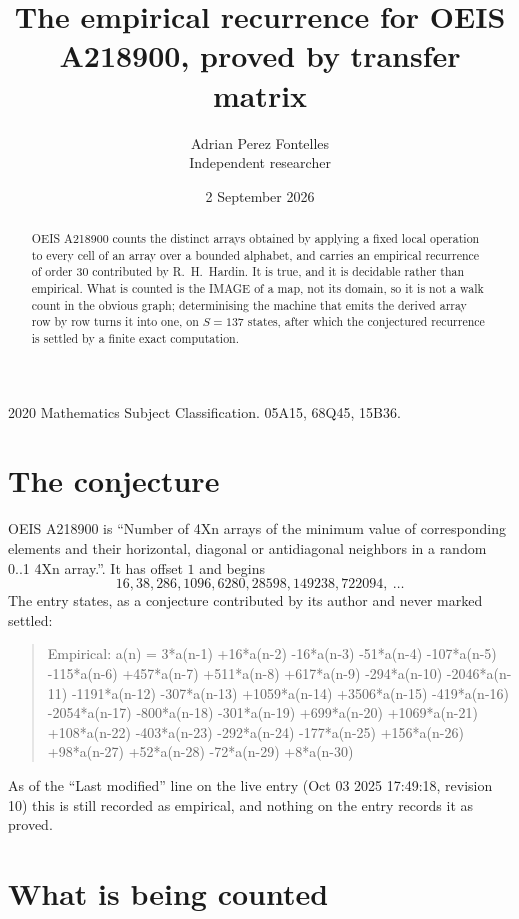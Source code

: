 \documentclass[11pt,a4paper]{article}
\title{The empirical recurrence for OEIS A218900, proved by transfer matrix}
\author{Adrian Perez Fontelles\\ \small Independent researcher}
\date{2 September 2026}
\theoremstyle{plain}
\theoremstyle{definition}
\begin{document}
\maketitle

\begin{abstract}
OEIS A218900 counts the distinct arrays obtained by applying a fixed local operation to every cell
of an array over a bounded alphabet, and carries an empirical recurrence of order $30$
contributed by R.~H.~Hardin. It is true, and it is decidable rather than empirical. What is
counted is the IMAGE of a map, not its domain, so it is not a walk count in the obvious graph;
determinising the machine that emits the derived array row by row turns it into one, on
$S=137$ states, after which the conjectured recurrence is settled by a finite exact
computation.
\end{abstract}

\noindent\small 2020 Mathematics Subject Classification. 05A15, 68Q45, 15B36.\normalsize

\section{The conjecture}

OEIS A218900 is ``Number of 4Xn arrays of the minimum value of corresponding elements and their horizontal, diagonal or antidiagonal neighbors in a random 0..1 4Xn array.''. It has offset $1$ and begins
\[
16, 38, 286, 1096, 6280, 28598, 149238, 722094,\ \dots
\]
The entry states, as a conjecture contributed by its author and never marked settled:
\begin{quote}
Empirical: a(n) = 3*a(n-1) +16*a(n-2) -16*a(n-3) -51*a(n-4) -107*a(n-5) -115*a(n-6) +457*a(n-7) +511*a(n-8) +617*a(n-9) -294*a(n-10) -2046*a(n-11) -1191*a(n-12) -307*a(n-13) +1059*a(n-14) +3506*a(n-15) -419*a(n-16) -2054*a(n-17) -800*a(n-18) -301*a(n-19) +699*a(n-20) +1069*a(n-21) +108*a(n-22) -403*a(n-23) -292*a(n-24) -177*a(n-25) +156*a(n-26) +98*a(n-27) +52*a(n-28) -72*a(n-29) +8*a(n-30)
\end{quote}
As of the ``Last modified'' line on the live entry (Oct 03 2025 17:49:18, revision 10) this is still
recorded as empirical, and nothing on the entry records it as proved.

\section{What is being counted}
\end{document}
